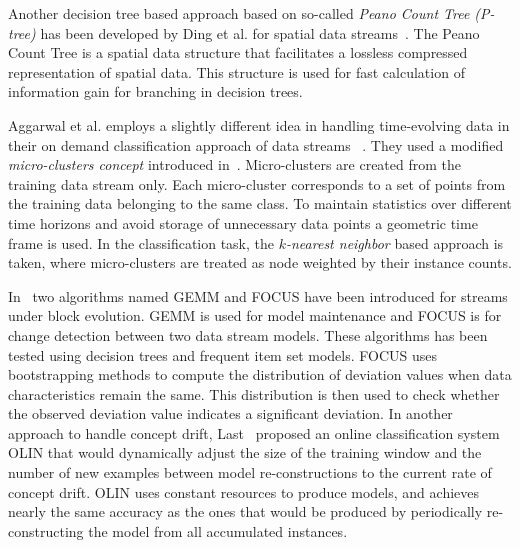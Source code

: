 Another decision tree based approach based on so-called \textit{Peano Count Tree (P-tree)} has been developed by Ding et al. for spatial data streams~\cite{ding02:peanocount}. The Peano Count Tree is a spatial data structure that facilitates a lossless compressed representation of spatial data. This structure is used for fast calculation of information gain for branching in decision trees.

Aggarwal et al. employs a slightly different idea in handling time-evolving data in their on demand classification approach of data streams ~\cite{aggarwal04:ondemand}. They used a modified \textit{micro-clusters concept} introduced in~\cite{aggarwal03:clustream}. Micro-clusters are created from the training data stream only. Each micro-cluster corresponds to a set of points from the training data belonging to the same class. To maintain statistics over different time horizons and avoid storage of unnecessary data points a geometric time frame is used. In the classification task, the \textit{$k$-nearest neighbor} based approach is taken, where micro-clusters are treated as node weighted by their instance counts. 

In~\cite{ganti02:gemm:focus} two algorithms named GEMM and FOCUS have been introduced for streams under block evolution. GEMM is used for model maintenance and FOCUS is for change detection between two data stream models. These algorithms has been tested using decision trees and frequent item set models. FOCUS uses bootstrapping methods to compute the distribution of deviation values when data characteristics remain the same. This distribution is then used to check whether the observed deviation value indicates a significant deviation. In another approach to handle concept drift, Last~\cite{last02:olin} proposed an online classification system OLIN that would dynamically adjust the size of the training window and the number of new examples between model re-constructions to the current rate of concept drift. OLIN uses constant resources to produce models, and achieves nearly the same accuracy as the ones that would be produced by periodically re-constructing the model from all accumulated instances.


